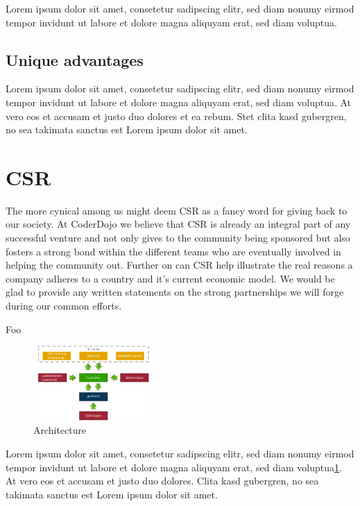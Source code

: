 \documentclass{proposal}
\makeatletter
\renewcommand{\paragraph}{
  \@startsection{paragraph}{4}
    {\z@}{1.25ex \@plus 1ex \@minus .2ex}{-1em}
      {\normalfont\normalsize\bfseries}
      }
\makeatother
\begin{document}
Lorem ipsum dolor sit amet, consetetur sadipscing elitr, sed diam nonumy
eirmod tempor invidunt ut labore et dolore magna aliquyam erat, sed diam
voluptua. 

\subsection*{Unique advantages}
Lorem ipsum dolor sit amet, consetetur sadipscing elitr, sed diam nonumy
eirmod tempor invidunt ut labore et dolore magna aliquyam erat, sed diam
voluptua. At vero eos et accusam et justo duo dolores et ea rebum. Stet
clita kasd gubergren, no sea takimata sanctus est Lorem ipsum dolor sit
amet.

\section*{CSR}
The more cynical among us might deem CSR as a fancy word for giving back to our society. At CoderDojo we believe that CSR is already an integral part of any successful venture and not only gives to the community being sponsored but also fosters a strong bond within the different teams who are eventually involved in helping the community out.
Further on can CSR help illustrate the real reasons a company adheres to a country and it's current economic model. We would be glad to provide any written statements on the strong partnerships we will forge during our common efforts.

\newpage


\paragraph{Foo}
\begin{figure}[h]
        \centering
        \includegraphics[width=0.4\textwidth]{images/BlockDiagram}
        \caption{Architecture}
        \label{fig:archDiagram}
\end{figure}

Lorem ipsum dolor sit amet, consetetur sadipscing elitr, sed diam nonumy
eirmod tempor invidunt ut labore et dolore magna aliquyam erat, sed diam
voluptua\ref{fig:archDiagram}. At vero eos et accusam et justo duo dolores.
Clita kasd gubergren, no sea takimata sanctus est Lorem ipsum dolor sit
amet.
\end{document}
